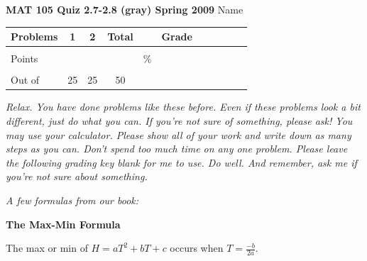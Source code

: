 \documentclass[12pt]{article}
\begin{document}
{\bf MAT 105 Quiz 2.7-2.8 (gray) Spring 2009} \hspace{.4in} {\large Name} \hrulefill

\hrulefill


\begin{center}

\begin{tabular}
{|l|c|c|c|c|c|c|c|c|c|c|} \hline

 Problems & \hspace{5 pt} 1 \hspace{5 pt}  & \hspace{5 pt} 2 \hspace{5 pt} &  \hspace{5 pt} Total  \hspace{5 pt} & &  \hspace{5 pt} Grade \hspace{5 pt}  \\ \hline
&&& &&\\  
Points &&& &    \hspace{.8in}\% &  \\ 
&&& && \\  \hline
Out of & 25 & 25  &50 & & \\ \hline

\end {tabular}
 
\end{center}

 \emph{Relax.  You have done problems like these before.  Even if these problems look a bit different, just do what you can.  If you're not sure of something, please ask! You may use your calculator.  Please show all of your work and write down as many steps as you can.  Don't spend too much time on any one problem.  Please leave the following grading key blank for me to use.  Do well.  And remember, ask me if you're not sure about something.}
 
 \vspace{.1in}
 
 \emph{A few formulas from our book:}
  \vspace{.2in}
 
  \begin{center}
\textbf{The Max-Min Formula}
\vspace{.1in}

The max or min of $H=aT^2+bT+c$ occurs when $\displaystyle T=\frac{-b}{2a}$.

 \end{center}
 
\end{document}
